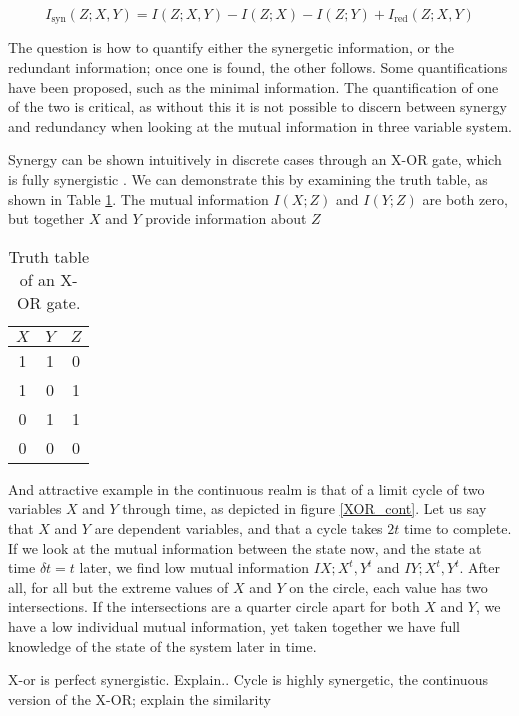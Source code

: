 \documentclass[../main.tex]{subfiles}
\begin{document}
\begin{equation}
I_\mathrm{syn}(Z;X,Y) = I(Z;X, Y) - I(Z; X) - I(Z; Y) + I_\mathrm{red}(Z;X,Y)
\end{equation}

The question is how to quantify either the synergetic information, or the redundant information; once one is found, the other follows.
Some quantifications have been proposed, such as the minimal information\cite{harder2013bivariate}.
The quantification of one of the two is critical, as without this it is not possible to discern between synergy and redundancy when looking at the mutual information in three variable system.

Synergy can be shown intuitively in discrete cases through an X-OR gate, which is fully synergistic \cite{quax2017quantifying}.
We can demonstrate this by examining the truth table, as shown in Table \ref{XOR}.
The mutual information $I(X;Z)$ and $I(Y;Z)$ are both zero, but together $X$ and $Y$ provide information about $Z$

\begin{table}
\begin{center}
\begin{tabular}{|c|c|c|}
\hline
$X$ & $Y$ & $Z$ \\
\hline
\hline
1 & 1 & 0 \\
1 & 0 & 1 \\
0 & 1 & 1 \\
0 & 0 & 0 \\
\hline
\end{tabular}
\end{center}
\caption{Truth table of an X-OR gate.}
\label{XOR}
\end{table}

And attractive example in the continuous realm is that of a limit cycle of two variables $X$ and $Y$ through time, as depicted in figure \ref{XOR_cont}.
Let us say that $X$ and $Y$ are dependent variables, and that a cycle takes $2t$ time to complete.
If we look at the mutual information between the state now, and the state at time $\delta t = t$ later, we find low mutual information $I{X;X^{t},Y^{t}}$ and $I{Y;X^{t},Y^{t}}$. After all, for all but the extreme values of $X$ and $Y$ on the circle, each value has two intersections. 
If the intersections are a quarter circle apart for both $X$ and $Y$, we have a low individual mutual information, yet taken together we have full knowledge of the state of the system later in time.

X-or is perfect synergistic.
Explain..
Cycle is highly synergetic, the continuous version of the X-OR; explain the similarity

\end{document}
